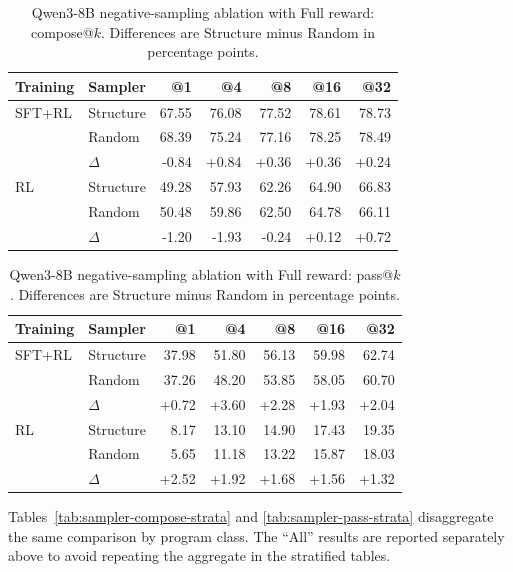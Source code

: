 \documentclass[10pt]{article}
\begin{document}
\begin{table}[htbp]
\centering

\begin{tabular}{llrrrrr}
\toprule
\rowcolor{headerbg}
Training & Sampler & @1 & @4 & @8 & @16 & @32 \\
\midrule
SFT+RL & Structure & 67.55 & 76.08 & 77.52 & 78.61 & 78.73 \\
       & Random    & 68.39 & 75.24 & 77.16 & 78.25 & 78.49 \\
       & $\Delta$ & -0.84 & +0.84 & +0.36 & +0.36 & +0.24 \\
\addlinespace
RL     & Structure & 49.28 & 57.93 & 62.26 & 64.90 & 66.83 \\
       & Random    & 50.48 & 59.86 & 62.50 & 64.78 & 66.11 \\
       & $\Delta$ & -1.20 & -1.93 & -0.24 & +0.12 & +0.72 \\
\bottomrule
\end{tabular}
\caption{Qwen3-8B negative-sampling ablation with Full reward: compose@\(k\). Differences are Structure minus Random in percentage points.}
\label{tab:sampler-compose-all}
\end{table}

\begin{table}[htbp]
\centering

\begin{tabular}{llrrrrr}
\toprule
\rowcolor{headerbg}
Training & Sampler & @1 & @4 & @8 & @16 & @32 \\
\midrule
SFT+RL & Structure & 37.98 & 51.80 & 56.13 & 59.98 & 62.74 \\
       & Random    & 37.26 & 48.20 & 53.85 & 58.05 & 60.70 \\
       & $\Delta$ & +0.72 & +3.60 & +2.28 & +1.93 & +2.04 \\
\addlinespace
RL     & Structure & 8.17 & 13.10 & 14.90 & 17.43 & 19.35 \\
       & Random    & 5.65 & 11.18 & 13.22 & 15.87 & 18.03 \\
       & $\Delta$ & +2.52 & +1.92 & +1.68 & +1.56 & +1.32 \\
\bottomrule
\end{tabular}
\caption{Qwen3-8B negative-sampling ablation with Full reward: pass@\(k\). Differences are Structure minus Random in percentage points.}
\label{tab:sampler-pass-all}
\end{table}

Tables~\ref{tab:sampler-compose-strata} and
\ref{tab:sampler-pass-strata} disaggregate the same comparison by program
class.  The ``All'' results are reported separately above to avoid repeating
the aggregate in the stratified tables.
\end{document}
